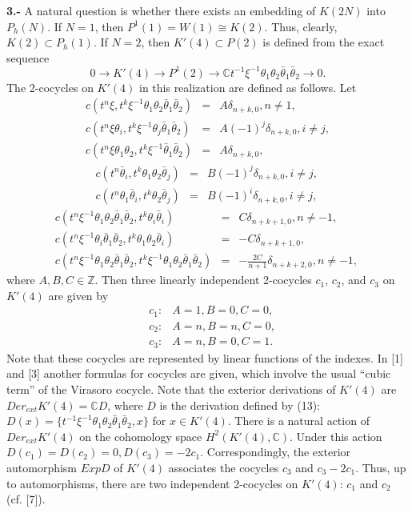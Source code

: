\documentclass[a4paper,a4paper]{article}
\begin{document}
{\bf 3.-} 
A natural question is whether there exists an embedding
of $K(2N)$ into $P_h(N)$.
If $N = 1$, then  $P^1(1) = W(1)\cong K(2)$. Thus, clearly, $K(2)\subset P_h(1)$.
If $N = 2$, then  $K'(4)\subset P(2)$
is defined from the exact sequence 
\begin{equation}
0\rightarrow K'(4)\rightarrow P^1(2)\rightarrow \mathbb C 
{t^{-1} \xi^{-1}\theta_1\theta_2\bar{\theta}_1\bar{\theta}_2}\rightarrow 0.
\end{equation}
The 2-cocycles
on $K'(4)$ in this realization are defined as follows. Let
\begin{eqnarray}
c(t^n\xi, t^k\xi^{-1}{\theta}_1{\theta}_2
\bar{\theta}_1\bar{\theta}_2) &=& A\delta_{n+k, 0}, n\not= 1,\nonumber\\
c(t^n\xi{\theta}_i, t^k\xi^{-1}{\theta}_j
\bar{\theta}_1\bar{\theta}_2) &=& A(-1)^j\delta_{n+k, 0}, i\not= j,\\
c(t^n\xi{\theta}_1{\theta}_2, t^k\xi^{-1}
\bar{\theta}_1\bar{\theta}_2) &=& A\delta_{n+k, 0},\nonumber\
\end{eqnarray}
\begin{eqnarray}
c(t^n\bar{\theta}_i, t^k{\theta}_1{\theta}_2\bar{\theta}_j) &=&
B(-1)^j\delta_{n+k, 0}, i\not= j,\nonumber\\
c(t^n{\theta}_1\bar{\theta}_i, t^k{\theta}_2\bar{\theta}_j) &=&
B(-1)^i\delta_{n+k, 0}, i\not= j,\nonumber\
\end{eqnarray}
\begin{eqnarray}
c(t^n\xi^{-1}{\theta}_1{\theta}_2\bar{\theta}_1\bar{\theta}_2,
t^k{\theta}_i\bar{\theta}_i) &=&  C\delta_{n+k+1, 0}, n\not= -1,\nonumber\\
c(t^n\xi^{-1}{\theta}_i\bar{\theta}_1\bar{\theta}_2,
t^k{\theta}_1{\theta}_2\bar{\theta}_i) &=&  -C\delta_{n+k+1, 0},\nonumber\\
c(t^n\xi^{-1}\theta_1\theta_2\bar{\theta}_1\bar{\theta}_2,
t^k\xi^{-1}\theta_1\theta_2\bar{\theta}_1\bar{\theta}_2) &=&
-\frac {2C}{n+1}\delta_{n+k+2, 0}, n \not= -1,\nonumber\
\end{eqnarray}
where $A, B, C \in \mathbb Z$.
Then three linearly independent 2-cocycles $c_1$, $c_2$, and $c_3$
on $K'(4)$ are given by 
\begin{eqnarray}
&c_1:& A = 1, B = 0, C = 0,\nonumber\\
&c_2:& A = n, B = n, C = 0,\\
&c_3:& A = n, B = 0, C = 1.\nonumber\
\end{eqnarray}
Note that these cocycles are represented by linear functions of the indexes.
In [1] and  [3] another formulas for cocycles are given, which involve
the usual ``cubic term'' of the Virasoro cocycle.
Note that the exterior derivations of $K'(4)$ are
$Der_{ext}K'(4) = \mathbb C D$, where $D$ is the derivation
defined by (13):
$D(x) = \lbrace t^{-1} \xi^{-1}\theta_1\theta_2\bar{\theta}_1\bar{\theta}_2,
x\rbrace$ for $x\in K'(4)$.
There is a natural action of $Der_{ext}K'(4)$ on
the cohomology space $H^2(K'(4), \mathbb C)$. Under this action 
$D(c_1) = D(c_2) = 0, D(c_3) = -2c_1$.
Correspondingly, the exterior automorphism $Exp D$ of $K'(4)$ 
associates the cocycles $c_3$ and $c_3 - 2c_1$.
Thus, up to automorphisms, there are two independent 2-cocycles 
on $K'(4)$: $c_1$ and $c_2$ (cf. [7]).
\end{document}
